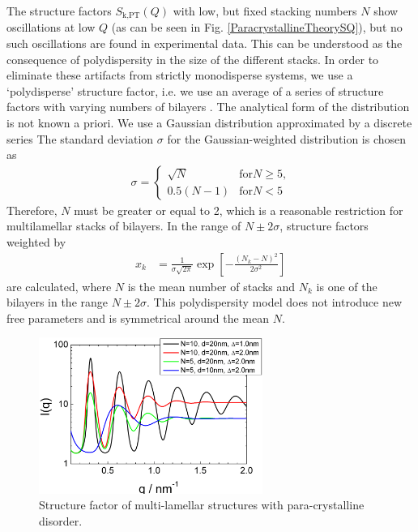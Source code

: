 The structure factors $S_\text{k,PT}(Q)$ with low, but fixed
stacking numbers $N$ show oscillations at low $Q$ (as can be seen in
Fig. \ref{ParacrystallineTheorySQ}), but no such oscillations are
found in experimental data. This can be understood as the
consequence of polydispersity in the size of the different stacks.
In order to eliminate these artifacts from strictly monodisperse
systems, we use a `polydisperse' structure factor, i.e. we use an
average of a series of structure factors with varying numbers of
bilayers \cite{Fruhwirth2004}. The analytical form of the
distribution is not known a priori. We use a Gaussian distribution
approximated by a discrete series The standard deviation $\sigma$
for the Gaussian-weighted distribution is chosen as
\begin{align}
\sigma =
\begin{cases}
\sqrt{N} & \text{for} N\geq 5 \text{,} \\
0.5(N-1) & \text{for} N< 5
\end{cases}
\end{align}
Therefore, $N$ must be greater or equal to 2, which is a
reasonable restriction for multilamellar stacks of bilayers. In
the range of $N \pm 2\sigma$, structure factors weighted by
\begin{align}
x_k & = \frac{1}{\sigma\sqrt{2\pi}} \exp\left[
-\frac{(N_k-N)^2}{2\sigma^2}\right]
\end{align}
are calculated, where $N$ is the mean number of stacks and $N_k$
is one of the  bilayers in the range $N\pm 2\sigma$. This
polydispersity model does not introduce new free parameters and is
symmetrical around the mean $N$.


\begin{figure}[htb]
\begin{center}
\includegraphics[width=0.65\textwidth,height=0.5\textwidth]{../images/structure_factor/Lamellar/PCLamellar.png}
\end{center}
\caption{Structure factor of multi-lamellar structures with para-crystalline disorder. }
\label{fig:PCLamellar}
\end{figure}

